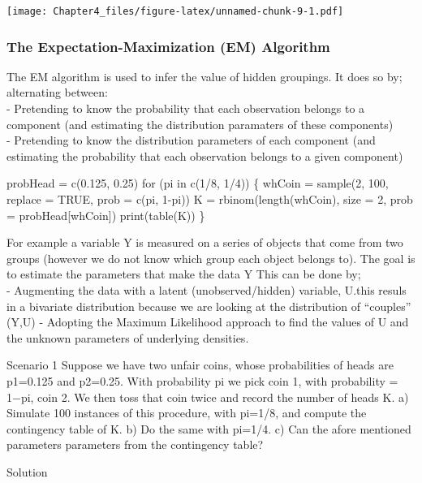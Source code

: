 \documentclass[]{article}
\begin{document}
\texttt{[image: Chapter4\_files/figure-latex/unnamed-chunk-9-1.pdf]}

\hypertarget{the-expectation-maximization-em-algorithm}{%
\subsubsection{The Expectation-Maximization (EM)
Algorithm}\label{the-expectation-maximization-em-algorithm}}

The EM algorithm is used to infer the value of hidden groupings. It does
so by; alternating between:\\
- Pretending to know the probability that each observation belongs to a
component (and estimating the distribution paramaters of these
components)\\
- Pretending to know the distribution parameters of each component (and
estimating the probability that each observation belongs to a given
component)

probHead = c(0.125, 0.25) for (pi in c(1/8, 1/4)) \{ whCoin = sample(2,
100, replace = TRUE, prob = c(pi, 1-pi)) K = rbinom(length(whCoin), size
= 2, prob = probHead{[}whCoin{]}) print(table(K)) \}

For example a variable Y is measured on a series of objects that come
from two groups (however we do not know which group each object belongs
to). The goal is to estimate the parameters that make the data Y This
can be done by;\\
- Augmenting the data with a latent (unobserved/hidden) variable, U.this
resuls in a bivariate distribution because we are looking at the
distribution of ``couples'' (Y,U) - Adopting the Maximum Likelihood
approach to find the values of U and the unknown parameters of
underlying densities.

Scenario 1 Suppose we have two unfair coins, whose probabilities of
heads are p1=0.125 and p2=0.25. With probability pi we pick coin 1, with
probability = 1−pi, coin 2. We then toss that coin twice and record the
number of heads K. a) Simulate 100 instances of this procedure, with
pi=1/8, and compute the contingency table of K. b) Do the same with
pi=1/4. c) Can the afore mentioned parameters parameters from the
contingency table?

Solution
\end{document}
